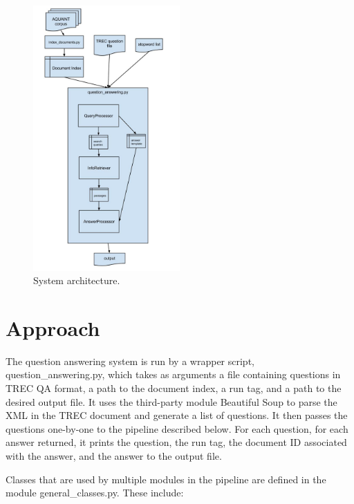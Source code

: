 \documentclass[11pt]{article}
\begin{document}
\begin{figure}
  \centering
    \includegraphics[width=0.5\textwidth]{system_architecture.jpg}
 \caption{System architecture.}
\end{figure}

\section{Approach}

The question answering system is run by a wrapper script, question\_answering.py, which takes as arguments a file containing questions in TREC QA format, a path to the document index, a run tag, and a path to the desired output file. It uses the third-party module Beautiful Soup to parse the XML in the TREC document and generate a list of questions. It then passes the questions one-by-one to the pipeline described below. For each question, for each answer returned, it prints the question, the run tag, the document ID associated with the answer, and the answer to the output file.

Classes that are used by multiple modules in the pipeline are defined in the module general\_classes.py. These include:
\end{document}
